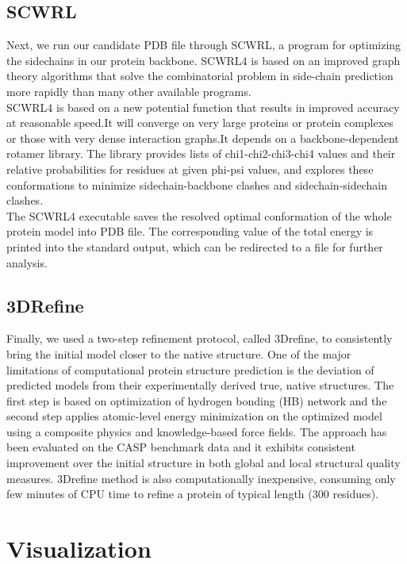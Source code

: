 \documentclass{article}
\begin{document}
\subsection{SCWRL}

Next, we run our candidate PDB file through SCWRL, a program for optimizing the sidechains in our protein backbone.  SCWRL4 is based on an improved graph theory algorithms that solve the combinatorial problem in side-chain prediction more rapidly than many other available programs.\\

SCWRL4 is based on a new potential function that results in improved accuracy at reasonable speed.It will converge on very large proteins or protein complexes or those with very dense interaction graphs.It depends on a backbone-dependent rotamer library. The library provides lists of chi1-chi2-chi3-chi4 values and their relative probabilities for residues at given phi-psi values, and explores these conformations to minimize sidechain-backbone clashes and sidechain-sidechain clashes.\\

The SCWRL4 executable saves the resolved optimal conformation of the whole protein model into PDB file. The corresponding value of the total energy is printed into the standard output, which can be redirected to a file for further analysis.

\subsection{3DRefine}

Finally, we used a two-step refinement protocol, called 3Drefine, to consistently bring the initial model closer to the native structure.  One of the major limitations of computational protein structure prediction is the deviation of predicted models from their experimentally derived true, native structures.  The first step is based on optimization of hydrogen bonding (HB) network and the second step applies atomic-level energy minimization on the optimized model using a composite physics and knowledge-based force fields. The approach has been evaluated on the CASP benchmark data and it exhibits consistent improvement over the initial structure in both global and local structural quality measures. 3Drefine method is also computationally inexpensive, consuming only few minutes of CPU time to refine a protein of typical length (300 residues).

\newpage
\section{Visualization}
\end{document}
